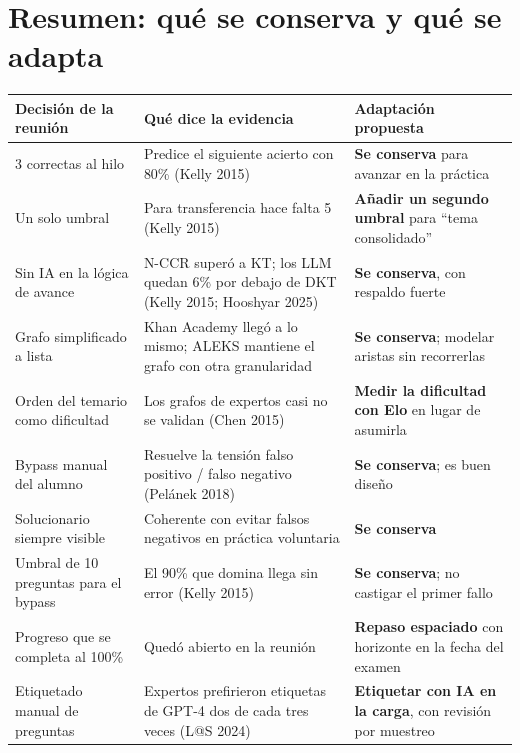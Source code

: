 \documentclass[11pt,a4paper]{article}
\begin{document}
\section{Resumen: qué se conserva y qué se adapta}

\begin{center}
\small
\begin{longtable}{p{4.3cm}p{5.2cm}p{5.2cm}}
\toprule
\textbf{Decisión de la reunión} & \textbf{Qué dice la evidencia} & \textbf{Adaptación propuesta} \\
\midrule
\endhead
3 correctas al hilo & Predice el siguiente acierto con 80\% (Kelly 2015) & \textbf{Se conserva} para avanzar en la práctica \\
\addlinespace
Un solo umbral & Para transferencia hace falta 5 (Kelly 2015) & \textbf{Añadir un segundo umbral} para ``tema consolidado'' \\
\addlinespace
Sin IA en la lógica de avance & N-CCR superó a KT; los LLM quedan 6\% por debajo de DKT (Kelly 2015; Hooshyar 2025) & \textbf{Se conserva}, con respaldo fuerte \\
\addlinespace
Grafo simplificado a lista & Khan Academy llegó a lo mismo; ALEKS mantiene el grafo con otra granularidad & \textbf{Se conserva}; modelar aristas sin recorrerlas \\
\addlinespace
Orden del temario como dificultad & Los grafos de expertos casi no se validan (Chen 2015) & \textbf{Medir la dificultad con Elo} en lugar de asumirla \\
\addlinespace
Bypass manual del alumno & Resuelve la tensión falso positivo / falso negativo (Pelánek 2018) & \textbf{Se conserva}; es buen diseño \\
\addlinespace
Solucionario siempre visible & Coherente con evitar falsos negativos en práctica voluntaria & \textbf{Se conserva} \\
\addlinespace
Umbral de 10 preguntas para el bypass & El 90\% que domina llega sin error (Kelly 2015) & \textbf{Se conserva}; no castigar el primer fallo \\
\addlinespace
Progreso que se completa al 100\% & Quedó abierto en la reunión & \textbf{Repaso espaciado} con horizonte en la fecha del examen \\
\addlinespace
Etiquetado manual de preguntas & Expertos prefirieron etiquetas de GPT-4 dos de cada tres veces (L@S 2024) & \textbf{Etiquetar con IA en la carga}, con revisión por muestreo \\
\bottomrule
\end{longtable}
\end{center}
\end{document}
